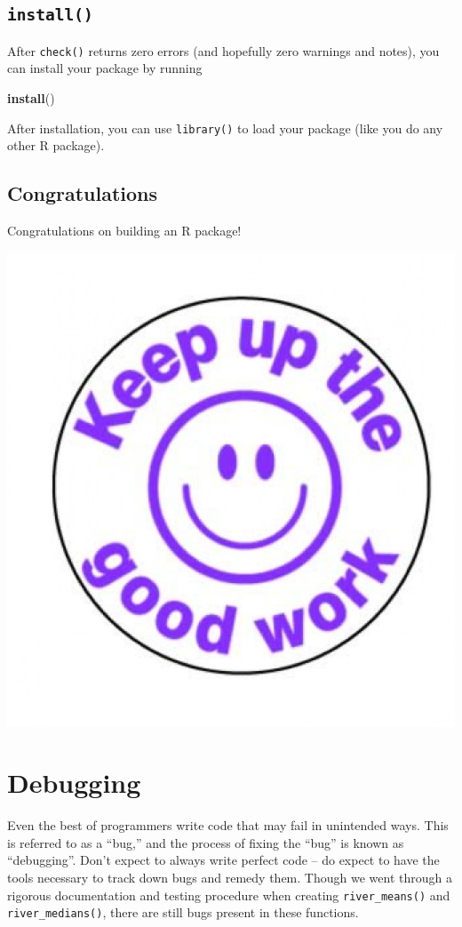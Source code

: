 \documentclass[
]{book}
\newenvironment{Shaded}{\begin{snugshade}}{\end{snugshade}}
\newcommand{\KeywordTok}[1]{\textcolor[rgb]{0.13,0.29,0.53}{\textbf{#1}}}
\newcommand{\NormalTok}[1]{#1}
\begin{document}
\hypertarget{install}{%
\subsection{\texorpdfstring{\texttt{install()}}{install()}}\label{install}}

After \texttt{check()} returns zero errors (and hopefully zero warnings and notes), you can install your package by running

\begin{Shaded}
\begin{Highlighting}[]
\KeywordTok{install}\NormalTok{()}
\end{Highlighting}
\end{Shaded}

After installation, you can use \texttt{library()} to load your package (like you do any other R package).

\hypertarget{congratulations}{%
\subsection{Congratulations}\label{congratulations}}

Congratulations on building an R package!

\includegraphics[width=0.5\linewidth]{images/you_did_it}

\hypertarget{debugging}{%
\section{Debugging}\label{debugging}}

Even the best of programmers write code that may fail in unintended ways. This is referred to as a ``bug,'' and the process of fixing the ``bug'' is known as ``debugging''. Don't expect to always write perfect code -- do expect to have the tools necessary to track down bugs and remedy them. Though we went through a rigorous documentation and testing procedure when creating \texttt{river\_means()} and \texttt{river\_medians()}, there are still bugs present in these functions.
\end{document}
